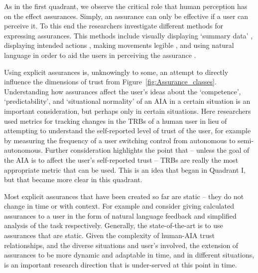 As in the first quadrant, we observe the critical role that human perception has on the effect assurances. Simply, an assurance can only be effective if a user can perceive it. To this end the researchers investigate different methods for expressing assurances. This methods include visually displaying `summary data' \cite{Muir1996-gt}, displaying intended actions \cite{Chadalavada2015-wx}, making movements legible \cite{Dragan2013-wd}, and using natural language in order to aid the users in perceiving the assurance \cite{Wang2016-id}.

Using explicit assurances is, unknowingly to some, an attempt to directly influence the dimensions of trust from Figure~\ref{fig:Assurance_classes}. Understanding how assurances affect the user's ideas about the `competence', `predictability', and `situational normality' of an AIA in a certain situation is an important consideration, but perhaps only in certain situations. Here researchers used metrics for tracking changes in the TRBs of a human user in lieu of attempting to understand the self-reported level of trust of the user, for example by measuring the frequency of a user switching control from autonomous to semi-autonomous. Further consideration highlights the point that -- unless the goal of the AIA is to affect the user's self-reported trust -- TRBs are really the most appropriate metric that can be used. This is an idea that began in Quadrant I, but that became more clear in this quadrant.

Most explicit assurances that have been created so far are static -- they do not change in time or with context. For example \cite{Wang2016-id} and \cite{Aitken2016-fb} consider giving calculated assurances to a user in the form of natural language feedback and simplified analysis of the task respectively. Generally, the state-of-the-art is to use assurances that are static. Given the complexity of human-AIA trust relationships, and the diverse situations and user's involved, the extension of assurances to be more dynamic and adaptable in time, and in different situations, is an important research direction that is under-served at this point in time.
